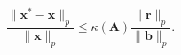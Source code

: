 \[\frac{\|\mathbf{x}^{*}-\mathbf{x}\|_{p}}{\|\mathbf{x}\|_{p}}\leq\kappa(\mathbf%
{A})\frac{\|\mathbf{r}\|_{p}}{\|\mathbf{b}\|_{p}}.\]